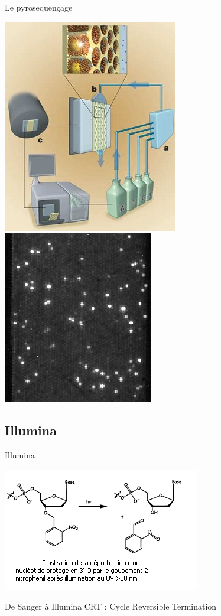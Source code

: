 \documentclass[12pt]{beamer}
\begin{document}
\begin{frame}{Le pyrosequençage}
\begin{center}
\includegraphics[scale=0.5]{./img/mach.png}
\includegraphics[scale=0.59]{./img/454.png}
\end{center}
\end{frame}

\subsection{Illumina}
\begin{frame}{Illumina}
\begin{center}
\includegraphics[scale=0.65]{./img/react.png}
\end{center}
\begin{block}{De Sanger à Illumina}
CRT : Cycle Reversible Termination
\end{block}
\end{frame}
\end{document}
